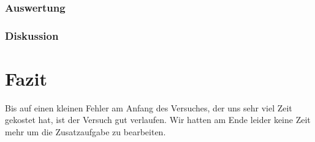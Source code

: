 \documentclass[12pt,a4paper]{article}
\begin{document}
\subsubsection*{Auswertung}


\subsubsection*{Diskussion}


\section{Fazit}
Bis auf einen kleinen Fehler am Anfang des Versuches, der uns sehr viel Zeit gekostet hat, ist der Versuch gut verlaufen. Wir hatten am Ende leider keine Zeit mehr um die Zusatzaufgabe zu bearbeiten.
\end{document}
